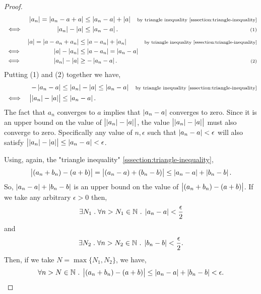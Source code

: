 \documentclass[../MathsNotesBase.tex]{subfiles}
\begin{document}
{\begin{proof}
			\begin{align*}
				&& \left\lvert a_n\right\rvert = \left\lvert a_n - a + a\right\rvert &\leq \left\lvert a_n - a\right\rvert + \left\lvert a\right\rvert  &\text{\scriptsize{by triangle inequality \ref{sssection:triangle-inequality}}}\\
				&\iff & \left\lvert a_n\right\rvert - \left\lvert a\right\rvert &\leq \left\lvert a_n - a\right\rvert. &\text{\scriptsize{(1)}} \\
			\end{align*}
			\begin{align*}
				&& \left\lvert a\right\rvert = \left\lvert a - a_n + a_n\right\rvert &\leq \left\lvert a - a_n\right\rvert + \left\lvert a_n\right\rvert  &\text{\scriptsize{by triangle inequality \ref{sssection:triangle-inequality}}}\\
				&\iff & \left\lvert a\right\rvert - \left\lvert a_n\right\rvert &\leq \left\lvert a - a_n\right\rvert = \left\lvert a_n - a\right\rvert &\text{\scriptsize{}} \\
				&\iff & \left\lvert a_n\right\rvert - \left\lvert a\right\rvert &\geq -\left\lvert a_n - a\right\rvert. &\text{\scriptsize{(2)}} \\
			\end{align*}
			Putting (1) and (2) together we have,
			\begin{align*}
				&& -\left\lvert a_n - a\right\rvert &\leq \left\lvert a_n\right\rvert - \left\lvert a\right\rvert \leq \left\lvert a_n - a\right\rvert &\text{\scriptsize{by triangle inequality \ref{sssection:triangle-inequality}}}\\
				&\iff & \left\lvert\left\lvert a_n\right\rvert - \left\lvert a\right\rvert\right\rvert &\leq \left\lvert a_n - a\right\rvert. \\
			\end{align*}
			The fact that $a_n$ converges to $a$ implies that $ \left\lvert a_n - a\right\rvert $ converges to zero. Since it is an upper bound on the value of ${ \left\lvert\left\lvert a_n\right\rvert - \left\lvert a\right\rvert\right\rvert }$, the value ${ \left\lvert\left\lvert a_n\right\rvert - \left\lvert a\right\rvert\right\rvert }$ must also converge to zero. Specifically any value of $ n, \epsilon $ such that ${ \left\lvert a_n - a\right\rvert < \epsilon }$ will also satisfy ${ \left\lvert\left\lvert a_n\right\rvert - \left\lvert a\right\rvert\right\rvert \leq \left\lvert a_n - a\right\rvert < \epsilon }$.
			
			Using, again, the "triangle inequality" \ref{sssection:triangle-inequality},
			\[ \left\lvert(a_n + b_n) - (a + b)\right\rvert = \left\lvert(a_n - a) + (b_n - b)\right\rvert \leq \left\lvert a_n - a\right\rvert + \left\lvert b_n - b\right\rvert. \]
			So, ${ \left\lvert a_n - a\right\rvert + \left\lvert b_n - b\right\rvert }$ is an upper bound on the value of ${ \left\lvert(a_n + b_n) - (a + b)\right\rvert }$. If we take any arbitrary ${ \epsilon > 0 }$ then,
			\[ \exists N_1 \;.\; \forall n > N_1 \in \mathbb{N}^{} \;.\; \left\lvert a_n - a\right\rvert < \frac{\epsilon}{2} \]
			and
			\[ \exists N_2 \;.\; \forall n > N_2 \in \mathbb{N}^{} \;.\; \left\lvert b_n - b\right\rvert < \frac{\epsilon}{2}. \]
			Then, if we take $ N = \max \{N_1, N_2\} $, we have,
			\[ \forall n > N \in \mathbb{N}^{} \;.\; \left\lvert(a_n + b_n) - (a + b)\right\rvert \leq \left\lvert a_n - a\right\rvert + \left\lvert b_n - b\right\rvert < \epsilon. \]
			

\end{proof}}
\end{document}
